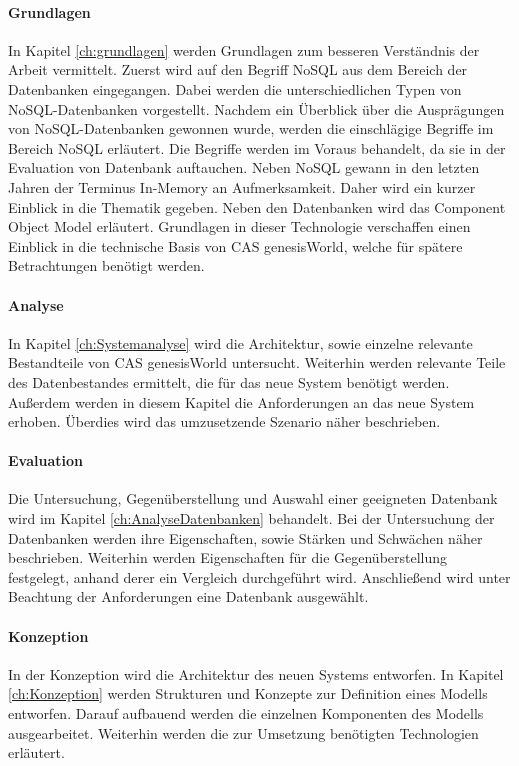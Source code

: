 \paragraph{Grundlagen} In Kapitel \ref{ch:grundlagen} werden Grundlagen zum besseren Verständnis der Arbeit vermittelt. Zuerst wird auf den Begriff NoSQL aus dem Bereich der Datenbanken eingegangen. Dabei werden die unterschiedlichen Typen von NoSQL-Datenbanken vorgestellt. Nachdem ein Überblick über die Ausprägungen von NoSQL-Datenbanken gewonnen wurde, werden die einschlägige Begriffe im Bereich NoSQL erläutert. Die Begriffe werden im Voraus behandelt, da sie in der Evaluation von Datenbank auftauchen. Neben NoSQL gewann in den letzten Jahren der Terminus In-Memory an Aufmerksamkeit. Daher wird ein kurzer Einblick in die Thematik gegeben. Neben den Datenbanken wird das Component Object Model erläutert. Grundlagen in dieser Technologie verschaffen einen Einblick in die technische Basis von CAS genesisWorld, welche für spätere Betrachtungen benötigt werden. 

\paragraph{Analyse} In Kapitel \ref{ch:Systemanalyse} wird die Architektur, sowie einzelne relevante Bestandteile von CAS genesisWorld untersucht. Weiterhin werden relevante Teile des Datenbestandes ermittelt, die für das neue System benötigt werden. Außerdem werden in diesem Kapitel die Anforderungen an das neue System erhoben. Überdies wird das umzusetzende Szenario näher beschrieben. 

\paragraph{Evaluation} Die Untersuchung, Gegenüberstellung und Auswahl einer geeigneten Datenbank wird im Kapitel \ref{ch:AnalyseDatenbanken} behandelt. Bei der Untersuchung der Datenbanken werden ihre Eigenschaften, sowie Stärken und Schwächen näher beschrieben. Weiterhin werden Eigenschaften für die Gegenüberstellung festgelegt, anhand derer ein Vergleich durchgeführt wird. Anschließend wird unter Beachtung der Anforderungen eine Datenbank ausgewählt.  

\paragraph{Konzeption} In der Konzeption wird die Architektur des neuen Systems entworfen. In Kapitel \ref{ch:Konzeption} werden Strukturen und Konzepte zur Definition eines Modells entworfen. Darauf aufbauend werden die einzelnen Komponenten des Modells ausgearbeitet. Weiterhin werden die zur Umsetzung benötigten Technologien  erläutert. 

